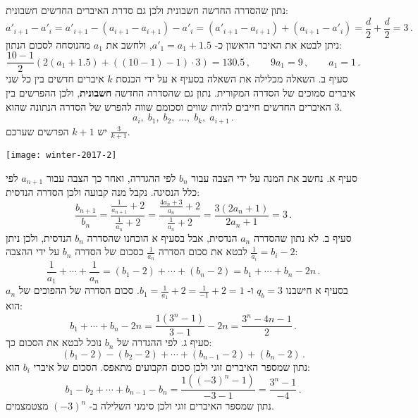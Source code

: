 נתון שהסדרה החדשה חשבונית ולכן גם סדרת האיברים החדשים חשבונית:
\[
a'_{i+1}-a'_{i}=a'_{i+1}-(a_{i+1}-a_{i+1})-a'_i=(a'_{i+1}-a_{i+1})+(a_{i+1}-a'_i)=\frac{d}{2}+\frac{d}{2}=3\,.
\]
ניתן לבטא את האיבר הראשון כ-%
$a'_1=a_1+1.5$,
ולחשב את
$a_1$
מהנוסחה לסכום הנתון:
\[
\frac{10-1}{2}(2(a_1+1.5)+((10-1)-1)\cdot 3) = 130.5\,,\quad\quad 9a_1=9\,,\quad\quad a_1=1\,.
\]
סעיף ב. השאלה מכלילה את השאלה בסעיף א על ידי הכנסת
$k$
איברים חדשים בין כל שני איברים סמוכים של הסדרה המקורית. נתון גם שהסדרה החדשה
\textbf{חשבונית},
ולכן ההפרשים בין האיברים החדשים חייבים להיות שווים וסכומם שווה להפרש של הסדרה הנתונה שהוא
$3$.
\[
a_i,\; b_1,\; b_2,\; \ldots,\; b_k,\; a_{i+1}\,.
\]
יש
$k+1$
הפרשים שערכם
$\displaystyle\frac{3}{k+1}$.

\bigskip

\textbf{}

\begin{center}
\texttt{[image: winter-2017-2]}
\end{center}
\vspace{-1ex}
סעיף א. נחשב את המנה על ידי הצבה עבור 
$b_n$
לפי ההגדרה, ואחר כך הצבה עבור 
$a_{n+1}$
לפי כלל הנסיגה. נקבל מנה קבועה ולכן הסדרה הנדסית:
\[
\frac{b_{n+1}}{b_n} = \frac{\displaystyle\frac{1}{a_{n+1}}+2}{\displaystyle\frac{1}{a_{n}}+2}= \frac{\displaystyle\frac{4a_n+3}{a_n}+2}{\displaystyle\frac{1}{a_{n}}+2}=\frac{3(2a_n+1)}{2a_n+1}=3\,.
\]
סעיף ב. לא נתון שהסדרה $a_n$ הנדסית, אבל בסעיף א הוכחנו שהסדרה  
$b_n$
הנדסית, ולכן ניתן לבטא את סכום הסדרה
$\displaystyle\frac{1}{a_n}$
כסכום של הסדרה
$b_n$
על ידי ההצבה 
$\displaystyle\frac{1}{a_i} = b_i - 2$:
\[
\frac{1}{a_1} + \cdots + \frac{1}{a_n}=(b_1-2) + \cdots + (b_n-2)=b_1+\cdots+b_n- 2n\,.
\]
בסעיף א חישבנו 
$q_b=3$
ו-%
$b_1=\displaystyle\frac{1}{a_1}+2=\displaystyle\frac{1}{-1}+2=1$.
סכום הסדרה של ההפוכים של 
$a_n$
הוא:
\[
b_1+\cdots+b_n- 2n=\frac{1(3^n-1)}{3-1} - 2n = \frac{3^n - 4n -1}{2}\,.
\]
סעיף ג. לפי ההגדרה של 
$b_n$
נוכל לבטא את הסכום כך:
\[
(b_1 - 2) - (b_2 - 2) + \cdots + (b_{n-1} - 2) + (b_n - 2)\,.
\]
נתון שמספר האיברים זוגי ולכן סכום הקבועים מתאפס. הסכום של איברי
$b_i$
הוא:
\[
b_1-b_2+\cdots+b_{n-1}-b_n=\frac{1((-3)^n-1)}{-3-1}=\frac{3^n-1}{-4}\,.
\]
נתון שמספר האיברים זוגי ולכן סימני השלילה ב-%
$(-3)^n$
מצטמצמים.

\bigskip

\textbf{}

